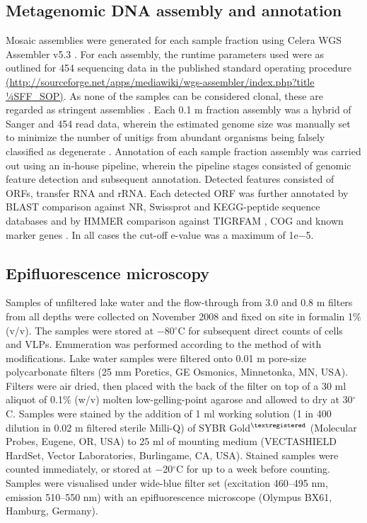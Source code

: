 \subsection{Metagenomic DNA assembly and annotation}
Mosaic assemblies were generated for each sample fraction using Celera \ac{WGS} Assembler v5.3 \cite{Myers2000}. 
For each assembly, the runtime parameters used were as outlined for 454 sequencing data in the published standard operating procedure\\ 
\url{(http://sourceforge.net/apps/mediawiki/wgs-assembler/index.php?title 1⁄4SFF\_SOP)}. 
As none of the samples can be considered clonal, these are regarded as stringent assemblies \cite{Rusch2007}. 
Each 0.1 \textmu{}m fraction assembly was a hybrid of Sanger and 454 read data, wherein the estimated genome size was manually set to minimize the number of unitigs from abundant organisms being falsely classified as degenerate \cite{Rusch2007}. 
Annotation of each sample fraction assembly was carried out using an in-house pipeline, wherein the pipeline stages consisted of genomic feature detection and subsequent annotation. 
Detected features consisted of \acp{ORF}, transfer \textsc{RNA} and \ac{rRNA}. 
Each detected \ac{ORF} was further annotated by \ac{BLAST} comparison against \ac{NR}, Swissprot and \ac{KEGG}-peptide sequence databases and by \ac{HMMER} comparison against \ac{TIGRFAM} \cite{Haft2001}, \ac{COG} \cite{Tatusov1997, Tatusov2003} and known marker genes \cite{vonMering2007}.
In all cases the cut-off e-value was a maximum of 1e$-$5. 


\subsection{Epifluorescence microscopy}
Samples of unfiltered lake water and the flow-through from 3.0 and 0.8 \textmu{}m filters from all depths were collected on November 2008 and fixed on site in formalin 1\% (v/v). 
The samples were stored at $-$80$^{\circ}$C for subsequent direct counts of cells and \acp{VLP}. 
Enumeration was performed according to the method of \citet{Patel2007} with modifications. 
Lake water samples were filtered onto 0.01 \textmu{}m pore-size polycarbonate filters (25 mm Poretics, \textsc{GE} Osmonics, Minnetonka, \textsc{MN}, \textsc{USA}). 
Filters were air dried, then placed with the back of the filter on top of a 30 ml aliquot of 0.1\% (w/v) molten low-gelling-point agarose and allowed to dry at 30$^{\circ}$C. 
Samples were stained by the addition of 1 ml working solution (1 in 400 dilution in 0.02 \textmu{}m filtered sterile Milli-Q) of \textsc{SYBR} Gold$^{\textregistered}$ (Molecular Probes, Eugene, \textsc{OR}, \textsc{USA}) to 25 ml of mounting medium (\textsc{VECTASHIELD} HardSet, Vector Laboratories, Burlingame, \textsc{CA}, \textsc{USA}). 
Stained samples were counted immediately, or stored at $-$20$^{\circ}$C for up to a week before counting. 
Samples were visualised under wide-blue filter set (excitation 460--495 nm, emission 510--550 nm) with an epifluorescence microscope (Olympus BX61, Hamburg, Germany).


